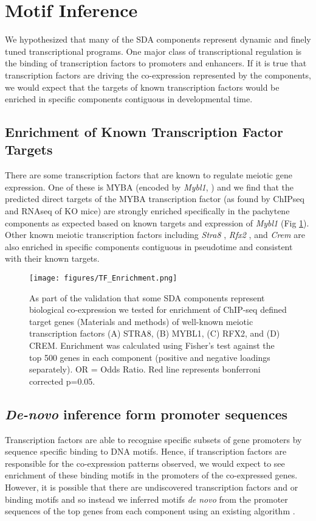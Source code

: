 \section{Motif Inference}
We hypothesized that many of the SDA components represent dynamic and finely tuned transcriptional programs. One major class of transcriptional regulation is the binding of transcription factors to promoters and enhancers. If it is true that transcription factors are driving the co-expression represented by the components, we would expect that the targets of known transcription factors would be enriched in specific components contiguous in developmental time.

\subsection{Enrichment of Known Transcription Factor Targets}
There are some transcription factors that are known to regulate meiotic gene expression. One of these is MYBA (encoded by \textit{Mybl1}, \cite{Bolcun-Filas2011AMYB}) and we find that the predicted direct targets of the MYBA transcription factor (as found by ChIPseq and RNAseq of KO mice) are strongly enriched specifically in the pachytene components as expected based on known targets and expression of \textit{Mybl1} (Fig \ref{fig:TF_Enrichment}). Other known meiotic transcription factors including \textit{Stra8} \parencite{Kojima2019Amplification}, \textit{Rfx2} \parencite{Kistler2015RFX2}, and \textit{Crem} \parencite{Nantel1996Spermiogenesis} are also enriched in specific components contiguous in pseudotime and consistent with their known targets.

\begin{figure}[H]
	\centering
	\texttt{[image: figures/TF\_Enrichment.png]}
	\caption{
	As part of the validation that some SDA components represent biological co-expression we tested for enrichment of ChIP-seq defined target genes (Materials and methods) of well-known meiotic transcription factors (A) STRA8, (B) MYBL1, (C) RFX2, and (D) CREM. Enrichment was calculated using Fisher’s test against the top 500 genes in each component (positive and negative loadings separately). OR = Odds Ratio. Red line represents bonferroni corrected p=0.05.
	}
	\label{fig:TF_Enrichment}
\end{figure}


\subsection{\emph{De-novo} inference form promoter sequences}
Transcription factors are able to recognise specific subsets of gene promoters by sequence specific binding to DNA motifs. Hence, if transcription factors are responsible for the co-expression patterns observed, we would expect to see enrichment of these binding motifs in the promoters of the co-expressed genes. However, it is possible that there are undiscovered transcription factors and or binding motifs and so instead we inferred motifs \textit{de novo} from the promoter sequences of the top genes from each component using an existing algorithm \parencite{Altemose2017map, Davies2016Reengineering}.

